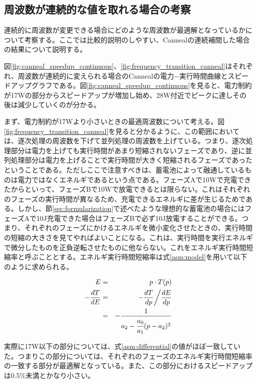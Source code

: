 \subsection{周波数が連続的な値を取れる場合の考察}
\label{subsec:continuous}


連続的に周波数が変更できる場合にどのような周波数が最適解となっているかについて考察する。ここでは比較的説明のしやすい、Cannealの連続補間した場合の結果について説明する。

図\ref{fig:canneal_speedup_continuous}、\ref{fig:frequency_transition_canneal}はそれぞれ、周波数が連続的に変えられる場合のCannealの電力−実行時間曲線とスピードアップグラフである。図\ref{fig:canneal_speedup_continuous}を見ると、電力制約が17Wの部分からスピードアップが増加し始め、28W付近でピークに達しその後は減少していくのが分かる。

まず、電力制約が17Wより小さいときの最適周波数について考える。図\ref{fig:frequency_transition_canneal}を見ると分かるように、この範囲においては、逐次処理の周波数を下げて並列処理の周波数を上げている。つまり、逐次処理部分は電力を上げても実行時間があまり短縮されないフェーズであり、逆に並列処理部分は電力を上げることで実行時間が大きく短縮されるフェーズであったということである。ただしここで注意すべきは、蓄電池によって融通しているものは電力ではなくエネルギであるという点である。フェーズAで10Wで充電できたからといって、フェーズBで10Wで放電できるとは限らない。これはそれぞれのフェーズの実行時間が異なるため、充電できるエネルギに差が生じるためである。しかし、節\ref{sec:formularization}で述べたような理想的な蓄電池の場合にはフェーズAで10J充電できた場合はフェーズBで必ず10J放電することができる。つまり、それぞれのフェーズにかけるエネルギを微小変化させたときの、実行時間の短縮の大きさを見てやればよいことになる。これは、実行時間を実行エネルギで微分したものを正負逆転させたものに他ならない。これをエネルギ実行時間短縮率と呼ぶこととする。エネルギ実行時間短縮率は式\ref{asm:model}を用いて以下のように求められる。

\begin{eqnarray}
E &=& p \cdot T(p)\\
-\frac{dT}{dE} &=& -\frac{dT}{dp} \bigg/ \frac{dE}{dp}\\
&=& -\frac{1}{a_2 - \cfrac{a_0}{a_1}( p-a_2)^2} \label{asm:differential}
\end{eqnarray}

実際に17W以下の部分については、式\ref{asm:differential}の値がほぼ一致していた。つまりこの部分については、それぞれのフェーズのエネルギ実行時間短縮率の一致する部分が最適解となっている。また、この部分におけるスピードアップは0.5\%未満とかなり小さい。

